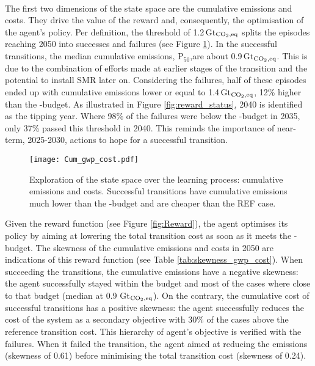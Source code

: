 \\

The first two dimensions of the state space are the cumulative emissions and costs. They drive the value of the reward and, consequently, the optimisation of the agent's policy. Per definition, the threshold of 1.2\,Gt$_{\ce{CO2},\text{eq}}$ splits the episodes reaching 2050 into successes and failures (see Figure \ref{fig:Cum_gwp_cost}). In the successful transitions, the median cumulative emissions, $\text{P}_{50}$,are about 0.9\,Gt$_{\ce{CO2},\text{eq}}$. This is due to the combination of efforts made at earlier stages of the transition and the potential to install \gls{SMR} later on. Considering the failures, half of these episodes ended up with cumulative emissions lower or equal to 1.4\,Gt$_{\ce{CO2},\text{eq}}$, 12\% higher than the -budget. As illustrated in Figure \ref{fig:reward_status}, 2040 is identified as the tipping year. Where 98\% of the failures were below the -budget in 2035, only 37\% passed this threshold in 2040. This reminds the importance of near-term, 2025-2030, actions to hope for a successful transition.

\begin{figure}[!htbp]
\centering
\texttt{[image: Cum\_gwp\_cost.pdf]}
\caption{Exploration of the state space over the learning process: cumulative emissions and costs. Successful transitions have cumulative emissions much lower than the -budget and are cheaper than the REF case. }
\label{fig:Cum_gwp_cost}
\end{figure}

Given the reward function (see Figure \ref{fig:Reward}), the agent optimises its policy by aiming at lowering the total transition cost as soon as it meets the -budget. The skewness of the cumulative emissions and costs in 2050 are indications of this reward function (see Table \ref{tab:skewness_gwp_cost}). When succeeding the transitions, the cumulative emissions have a negative skewness: the agent successfully stayed within the budget and most of the cases where close to that budget (median at 0.9 Gt$_{\ce{CO2},\text{eq}}$). On the contrary, the cumulative cost of successful transitions has a positive skewness: the agent successfully reduces the cost of the system as a secondary objective with 30\% of the cases above the reference transition cost. This hierarchy of agent's objective is verified with the failures. When it failed the transition, the agent aimed at reducing the emissions (skewness of 0.61) before minimising the total transition cost (skewness of 0.24). 

